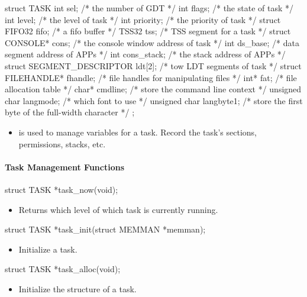 \documentclass{swfcthesis}
\begin{document}
\begin{codeblock}[1]
\begin{ccode}
struct TASK
{ 
  int sel;              /* the number of GDT */
  int flags;            /* the state of task */
  int level;            /* the level of task */
  int priority;         /* the priority of task */
  struct FIFO32 fifo;   /* a fifo buffer */
  TSS32 tss;            /* TSS segment for a task */
  struct CONSOLE* cons; /* the console window address of task */
  int ds_base;          /* data segment address of APPs */
  int cons_stack;       /* the stack address of APPs */
  struct SEGMENT_DESCRIPTOR ldt[2]; /* tow LDT segments of task */
  struct FILEHANDLE* fhandle; /* file handles for manipulating files */
  int* fat; /* file allocation table */
  char* cmdline; /* store the command line context */
  unsigned char langmode;  /* which font to use */
  unsigned char langbyte1; /* store the first byte of the full-width character */
};
\end{ccode}
\end{codeblock}
\begin{itemize}
\item is used to manage variables for a task. Record the task's sections, permissions,
  stacks, etc.
\end{itemize}

\paragraph{Task Management Functions}

\begin{ccode}
struct TASK *task_now(void);
\end{ccode}
\begin{itemize}
\item Returns which level of which task is currently running.
\end{itemize}

\begin{ccode}
struct TASK *task_init(struct MEMMAN *memman);
\end{ccode}
\begin{itemize}
\item Initialize a task.
\end{itemize}

\begin{ccode}
struct TASK *task_alloc(void);
\end{ccode}
\begin{itemize}
\item Initialize the structure of a task.
\end{itemize}
\end{document}
